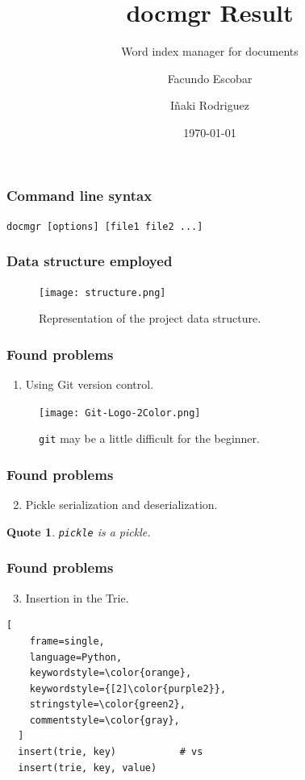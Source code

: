 \documentclass{beamer}
\title{docmgr Result}
\subtitle{Word index manager for documents}
\author[Facundo E. \and Iñaki R.]{Facundo Escobar \and Iñaki Rodriguez}
\institute[UnCuyo]{Universidad Nacional de Cuyo}
\date{\today}
\newtheorem{blkquote}{Quote}
\begin{document}
\begin{frame}
  \titlepage
\end{frame}

\begin{frame}[c]
  \frametitle{Command line syntax}
  \centering
  \texttt{docmgr [options] [file1 file2 ...]}
\end{frame}

\begin{frame}
  \frametitle{Data structure employed}
  \begin{figure}
    \texttt{[image: structure.png]}
    \caption{Representation of the project data structure.}
    \label{fig:structure1}
  \end{figure}
\end{frame}

\begin{frame}
  \frametitle{Found problems}
  \begin{enumerate}
    \item Using Git version control.
  \end{enumerate}
  \begin{figure}[h!]
    \texttt{[image: Git-Logo-2Color.png]}
    \caption{\texttt{git} may be a little difficult for the beginner.}
    \label{fig:git3}
  \end{figure}
\end{frame}

\begin{frame}
  \frametitle{Found problems}
  \begin{enumerate}
    \setcounter{enumi}{1}
    \item Pickle serialization and deserialization.
  \end{enumerate}
  \begin{blkquote}
    \texttt{pickle} is a pickle.
  \end{blkquote}
\end{frame}

\begin{frame}[fragile]
  \frametitle{Found problems}
  \begin{enumerate}
    \setcounter{enumi}{2}
    \item Insertion in the Trie.
  \end{enumerate}
  \begin{lstlisting}[
    frame=single,
    language=Python,
    keywordstyle=\color{orange},
    keywordstyle={[2]\color{purple2}},
    stringstyle=\color{green2},
    commentstyle=\color{gray},
  ]
  insert(trie, key)           # vs
  insert(trie, key, value)
  \end{lstlisting}
\end{frame}
\end{document}
